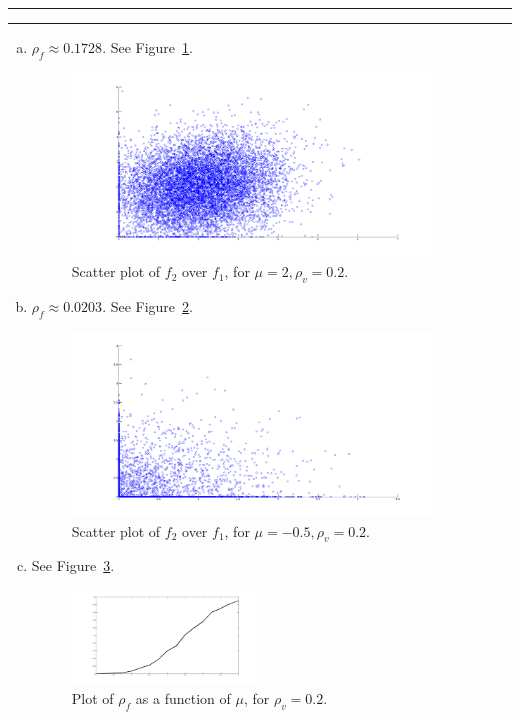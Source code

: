 \documentclass[11pt]{article}
\newcounter{questionCounter}
\newcounter{partCounter}[questionCounter]
\newenvironment{question}[2][\arabic{questionCounter}]{%
    \setcounter{partCounter}{0}%
    \vspace{.25in} \hrule \vspace{0.5em}%
        \noindent{\bf #2}%
    \vspace{0.8em} \hrule \vspace{.10in}%
    \addtocounter{questionCounter}{1}%
}{}
\begin{document}
\begin{question}{Problem 6}
\begin{enumerate}[a.]
\item $\rho_f \approx 0.1728$. See Figure~\ref{fig:6a}.
\begin{figure}[h]
\begin{center}
\includegraphics[width=0.9\textwidth]{6a}
\end{center}
\caption{Scatter plot of $f_2$ over $f_1$, for $\mu = 2,\rho_v = 0.2$.}
\label{fig:6a}
\end{figure}
\newpage

\item $\rho_f \approx 0.0203$. See Figure~\ref{fig:6b}.
\begin{figure}[h]
\begin{center}
\includegraphics[width=0.9\textwidth]{6b}
\end{center}
\caption{Scatter plot of $f_2$ over $f_1$, for $\mu = -0.5,\rho_v = 0.2$.}
\label{fig:6b}
\end{figure}

\item See Figure~\ref{fig:6c}. 
\begin{figure}[h]
\begin{center}
\includegraphics[width=0.46\textwidth]{6c}
\end{center}
\caption{Plot of $\rho_f$ as a function of $\mu$, for $\rho_v = 0.2$.}
\label{fig:6c}
\end{figure}
\newpage


\end{enumerate}
\end{question}
\end{document}
